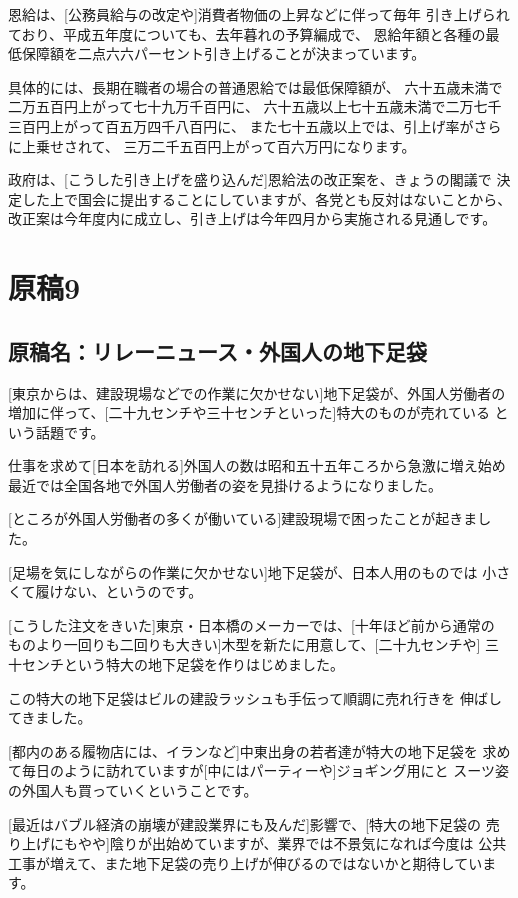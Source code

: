恩給は、[公務員給与の改定や]消費者物価の上昇などに伴って毎年
引き上げられており、平成五年度についても、去年暮れの予算編成で、
恩給年額と各種の最低保障額を二点六六パーセント引き上げることが決まっています。

具体的には、長期在職者の場合の普通恩給では最低保障額が、
六十五歳未満で二万五百円上がって七十九万千百円に、
六十五歳以上七十五歳未満で二万七千三百円上がって百五万四千八百円に、
また七十五歳以上では、引上げ率がさらに上乗せされて、
三万二千五百円上がって百六万円になります。

政府は、[こうした引き上げを盛り込んだ]恩給法の改正案を、きょうの閣議で
決定した上で国会に提出することにしていますが、各党とも反対はないことから、
改正案は今年度内に成立し、引き上げは今年四月から実施される見通しです。

\section{原稿9}

\subsection*{原稿名：リレーニュース・外国人の地下足袋}

[東京からは、建設現場などでの作業に欠かせない]地下足袋が、外国人労働者の
増加に伴って、[二十九センチや三十センチといった]特大のものが売れている
という話題です。

仕事を求めて[日本を訪れる]外国人の数は昭和五十五年ころから急激に増え始め
最近では全国各地で外国人労働者の姿を見掛けるようになりました。

[ところが外国人労働者の多くが働いている]建設現場で困ったことが起きました。

[足場を気にしながらの作業に欠かせない]地下足袋が、日本人用のものでは
小さくて履けない、というのです。

[こうした注文をきいた]東京・日本橋のメーカーでは、[十年ほど前から通常の
ものより一回りも二回りも大きい]木型を新たに用意して、[二十九センチや]
三十センチという特大の地下足袋を作りはじめました。

この特大の地下足袋はビルの建設ラッシュも手伝って順調に売れ行きを
伸ばしてきました。

[都内のある履物店には、イランなど]中東出身の若者達が特大の地下足袋を
求めて毎日のように訪れていますが[中にはパーティーや]ジョギング用にと
スーツ姿の外国人も買っていくということです。

[最近はバブル経済の崩壊が建設業界にも及んだ]影響で、[特大の地下足袋の
売り上げにもやや]陰りが出始めていますが、業界では不景気になれば今度は
公共工事が増えて、また地下足袋の売り上げが伸びるのではないかと期待しています。


